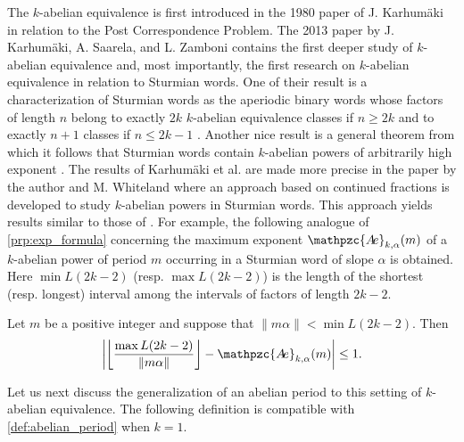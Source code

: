 \documentclass[a4paper,fleqn]{article}
\providecommand{\Abs}[1]{\left\lvert#1\right\rvert}
\providecommand{\norm}[1]{\lVert#1\rVert}
\providecommand{\Floor}[1]{\left\lfloor#1\right\rfloor}
\newcommand{\abexp}[2][]{\mathpzc{A\mkern-3mu e}_{#1}(#2)}
\begin{document}
  The $k$-abelian equivalence is first introduced in the 1980 paper of J. Karhumäki
  \cite{1980:generalized_parikh_mappings_and_homomorphisms} in relation to the Post Correspondence Problem. The 2013
  paper \cite{2013:on_a_generalization_of_abelian_equivalence_and_complexity_of_infinite} by J. Karhumäki, A. Saarela,
  and L. Zamboni contains the first deeper study of $k$-abelian equivalence and, most importantly, the first research
  on $k$-abelian equivalence in relation to Sturmian words. One of their result is a characterization of Sturmian words
  as the aperiodic binary words whose factors of length $n$ belong to exactly $2k$ $k$-abelian equivalence classes if
  $n \geq 2k$ and to exactly $n + 1$ classes if $n \leq 2k - 1$
  \cite[Thm.~4.1]{2013:on_a_generalization_of_abelian_equivalence_and_complexity_of_infinite}. Another nice result is a
  general theorem from which it follows that Sturmian words contain $k$-abelian powers of arbitrarily high exponent
  \cite[Thm.~5.4]{2013:on_a_generalization_of_abelian_equivalence_and_complexity_of_infinite}. The results of Karhumäki
  et al. are made more precise in the paper \cite{2020:on_k-abelian_equivalence_and_generalized_lagrange_spectra} by
  the author and M. Whiteland where an approach based on continued fractions is developed to study $k$-abelian powers
  in Sturmian words. This approach yields results similar to those of
  \cite{2016:abelian_powers_and_repetitions_in_sturmian_words}. For example, the following analogue of
  \autoref{prp:exp_formula} concerning the maximum exponent $\abexp[k,\alpha]{m}$ of a $k$-abelian power of period $m$
  occurring in a Sturmian word of slope $\alpha$ is obtained. Here $\min L(2k-2)$ (resp. $\max L(2k-2)$) is the length
  of the shortest (resp. longest) interval among the intervals of factors of length $2k-2$.

  \begin{proposition}\cite[Lemma~3.10]{2020:on_k-abelian_equivalence_and_generalized_lagrange_spectra}
    Let $m$ be a positive integer and suppose that $\norm{m\alpha} < \min L(2k-2)$. Then
    \begin{equation*}
      \Abs{\Floor{\frac{\max L(2k-2)}{\norm{m\alpha}}} - \abexp[k,\alpha]{m}} \leq 1.
    \end{equation*}
  \end{proposition}

  Let us next discuss the generalization of an abelian period to this setting of $k$-abelian equivalence. The following
  definition is compatible with \autoref{def:abelian_period} when $k = 1$.
\end{document}
